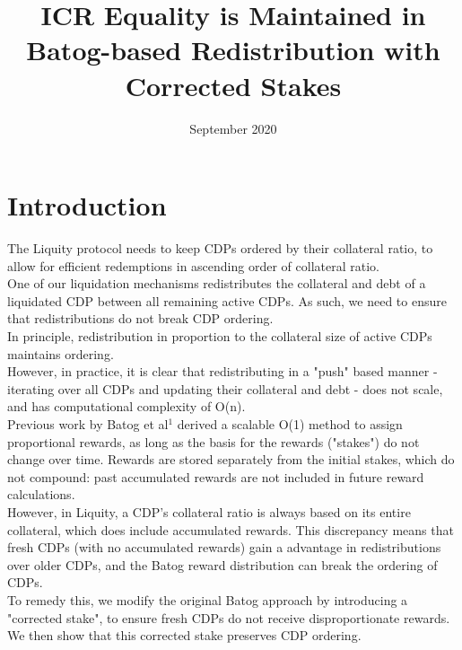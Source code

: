 \documentclass[reqno]{article}
\begin{document}
\title{\textbf{ICR Equality is Maintained in Batog-based Redistribution with Corrected Stakes}}
\date{September 2020}
\maketitle

\tableofcontents

\section{Introduction}


The Liquity protocol needs to keep CDPs ordered by their collateral ratio, to allow for efficient redemptions in ascending order of collateral ratio. \\

One of our liquidation mechanisms redistributes the collateral and debt of a liquidated CDP between all remaining active CDPs. As such, we need to ensure that redistributions do not break CDP ordering. \\

In principle, redistribution in proportion to the collateral size of active CDPs maintains ordering. \\

However, in practice, it is clear that redistributing in a "push" based manner - iterating over all CDPs and updating their collateral and debt - does not scale, and has computational complexity of O(n). \\

Previous work by Batog et al$^{1}$ derived a scalable O(1) method to assign proportional rewards, as long as the basis for the rewards ("stakes") do not change over time. Rewards are stored separately from the initial stakes, which do not compound: past accumulated rewards are not included in future reward calculations. \\

However, in Liquity, a CDP's collateral ratio is always based on its entire collateral, which does include accumulated rewards. This discrepancy means that fresh CDPs (with no accumulated rewards) gain a advantage in redistributions over older CDPs, and the Batog reward distribution can break the ordering of CDPs. \\

To remedy this, we modify the original Batog approach by introducing a "corrected stake", to ensure fresh CDPs do not receive disproportionate rewards. We then show that this corrected stake preserves CDP ordering. \\
\end{document}
